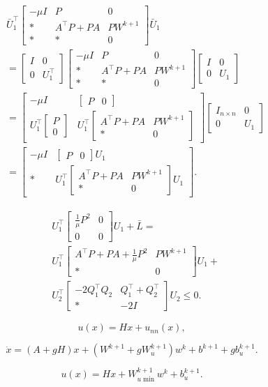 \documentclass[10pt,a4paper]{amsart}
\newcommand{\bbm}[1]{\left[\begin{matrix} #1 \end{matrix}\right]}
\begin{document}
 \begin{equation}\label{TH121P1}
\begin{aligned}
&\bar{U}_1^\top
\bbm{-\mu I&P&0\\
   \ast&  A^\top P+PA &PW^{k+1}\\
  \ast& \ast & 0
}\bar{U}_1\\&=\bbm{I&0\\0&U^\top_1}\bbm{-\mu I&P&0\\
   \ast&  A^\top P+PA &PW^{k+1}\\
  \ast& \ast & 0
}\bbm{I&0\\0&U_1}\\&=
\bbm{-\mu I&\bbm{P&0}\\U_1^\top \bbm{P\\0}&U_1^\top\bbm{A^\top P+PA &PW^{k+1}\\
 \ast& 0}}\bbm{I_{n\times n}&0\\0&U_1}\\&=\bbm{-\mu I&\bbm{P&0}U_1\\\ast&U_1^\top\bbm{A^\top P+PA &PW^{k+1}\\
  \ast & 0}U_1}.
\end{aligned}
\end{equation}

\begin{equation}\label{TH121P4}
\begin{aligned}
&U_1^\top\bbm{\frac{1}{\mu}P^2&0\\0&0}U_1+\bar{L}=\\&U_1^\top
\begin{bmatrix}
     A^\top P+PA+\frac{1}{\mu}P^2 &PW^{k+1}\\
   \ast & 0
\end{bmatrix}U_1+\\&U_2^\top\begin{bmatrix}
 -2Q_1^\top Q_2&Q_1^\top+Q_2^\top
 \\
\ast&-2I
\end{bmatrix}U_2\leq 0.
\end{aligned}
\end{equation}

\begin{equation}\label{NNC10}
u(x)=Hx+u_{nn}(x),
\end{equation}

\begin{equation}\label{NNC3}
  \dot{x}=(A+gH)x+(W^{k+1}+gW_u^{k+1})w^k+b^{k+1}+gb_u^{k+1}.
\end{equation}

\begin{equation}\label{NNC11}
u(x)=Hx+W_{u\min}^{k+1}w^k+b_u^{k+1}.
\end{equation}
\end{document}
